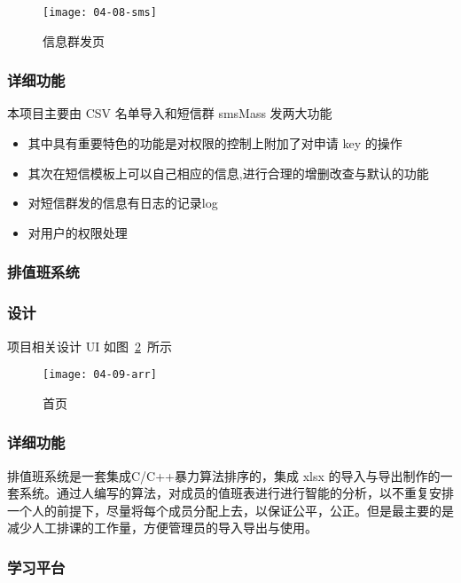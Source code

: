 \begin{figure}[htbp]
\centering
\texttt{[image: 04-08-sms]}
\caption{信息群发页}
\label{fig:04-08-sms}
\end{figure}

\subsubsection*{详细功能}

本项目主要由 CSV 名单导入和短信群 smsMass 发两大功能
\begin{itemize}
  \item 其中具有重要特色的功能是对权限的控制上附加了对申请 key 的操作
  \item 其次在短信模板上可以自己相应的信息,进行合理的增删改查与默认的功能
  \item 对短信群发的信息有日志的记录log
  \item 对用户的权限处理
\end{itemize}

\subsubsection{排值班系统}

\subsubsection*{设计}

项目相关设计 UI 如图~\ref{fig:04-09-arr}~所示

\begin{figure}[htbp]
\centering
\texttt{[image: 04-09-arr]}
\caption{首页}
\label{fig:04-09-arr}
\end{figure}

\subsubsection*{详细功能}

排值班系统是一套集成C/C++暴力算法排序的，集成 xlsx 的导入与导出制作的一套系统。通过人编写的算法，对成员的值班表进行进行智能的分析，以不重复安排一个人的前提下，尽量将每个成员分配上去，以保证公平，公正。但是最主要的是减少人工排课的工作量，方便管理员的导入导出与使用。

\subsubsection{学习平台}

